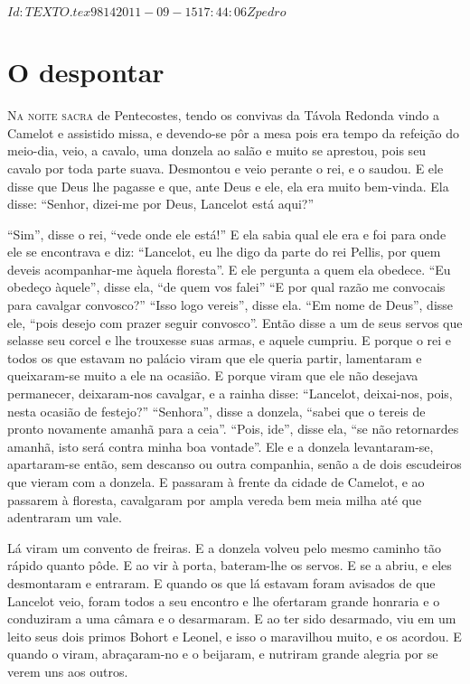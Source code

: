 \SVN $Id: TEXTO.tex 9814 2011-09-15 17:44:06Z pedro $

\begin{comment}
TRADUÇÃO DA VERSÃO ALEMÃ DE \textit{A DEMANDA DO SANTO GRAAL} (Códice 147 da
\textit{Bibliotheca Palatina Germaniae}, de Heidelberg, fins do século XIII). 
\end{comment}

\chapter{O despontar} 

\textsc{Na noite sacra} de Pentecostes, tendo os convivas da Távola Redonda vindo a
Camelot e assistido missa, e devendo-se pôr a mesa pois era tempo da refeição do
meio-dia, veio, a cavalo, uma donzela ao salão e muito se aprestou, pois seu
cavalo por toda parte suava. Desmontou e veio perante o rei, e o saudou. E ele
disse que Deus lhe pagasse e que, ante Deus e ele, ela era muito bem-vinda. Ela
disse: “Senhor, dizei-me por Deus, Lancelot está aqui?”

“Sim”, disse o rei, “vede onde ele está!” E ela sabia qual ele era e foi para
onde ele se encontrava e diz: “Lancelot, eu lhe digo da parte do rei Pellis,
por quem deveis acompanhar-me àquela floresta”. E ele pergunta a quem ela
obedece. “Eu obedeço àquele”, disse ela, “de quem vos falei” “E por qual razão
me convocais para cavalgar convosco?” “Isso logo vereis”, disse ela. “Em nome
de Deus”, disse ele, “pois desejo com prazer seguir convosco”. Então disse a um
de seus servos que selasse seu corcel e lhe trouxesse suas armas, e aquele
cumpriu. E porque o rei e todos os que estavam no palácio viram que ele queria
partir, lamentaram e queixaram-se muito a ele na ocasião. E porque viram que
ele não desejava permanecer, deixaram-nos cavalgar, e a rainha disse:
“Lancelot, deixai-nos, pois, nesta ocasião de festejo?” “Senhora”, disse a
donzela, “sabei que o tereis de pronto novamente amanhã para a ceia”. “Pois,
ide”, disse ela, “se não retornardes amanhã, isto será contra minha boa
vontade”. Ele e a donzela levantaram-se, apartaram-se então, sem descanso ou
outra companhia, senão a de dois escudeiros que vieram com a donzela. E
passaram à frente da cidade de Camelot, e ao passarem à floresta, cavalgaram por
ampla vereda bem meia milha até que adentraram um vale.

Lá viram um convento de freiras. E a donzela volveu pelo mesmo caminho tão
rápido quanto pôde. E ao vir à porta, bateram-lhe os servos. E se a abriu, e
eles desmontaram e entraram. E quando os que lá estavam foram avisados de que
Lancelot veio, foram todos a seu encontro e lhe ofertaram grande honraria e o
conduziram a uma câmara e o desarmaram. E ao ter sido desarmado, viu em um
leito seus dois primos Bohort e Leonel, e isso o maravilhou muito, e os
acordou. E quando o viram, abraçaram-no e o beijaram, e nutriram grande alegria
por se verem uns aos outros. 

